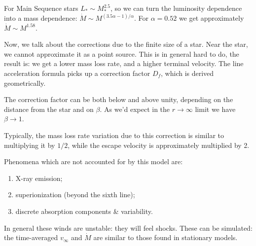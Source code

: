 \documentclass[main.tex]{subfiles}
\begin{document}
For Main Sequence stars \(L_{*} \sim M_{*}^{2.5}\), so we can turn the luminosity dependence into a mass dependence: \(\dot{M} \sim M^{(3.5 \alpha  - 1 ) / \alpha }\).
For \(\alpha = 0.52\) we get approximately \(\dot{M} \sim M^{1.58}\).

Now, we talk about the corrections due to the finite size of a star. Near the star, we cannot approximate it as a point source.
This is in general hard to do, the result is: we get a lower mass loss rate, and a higher terminal velocity. 
The line acceleration formula picks up a correction factor \(D_f\), which is derived geometrically. 


The correction factor can be both below and above unity, depending on the distance from the star and on \(\beta \). 
As we'd expect in the \(r \rightarrow \infty \) limit we have \(\beta \rightarrow 1\). 

Typically, the mass loss rate variation due to this correction is similar to multiplying it by \(1/2\), while the escape velocity is approximately multiplied by 2. 

Phenomena which are not accounted for by this model are: 
\begin{enumerate}
    \item X-ray emission;
    \item superionization (beyond the sixth line);
    \item discrete absorption components \& variability.
\end{enumerate}

In general these winds are unstable: they will feel shocks. 
These can be simulated: the time-averaged \(v_{ \infty }\) and \(\dot{M}\) are similar to those found in stationary models. 
\end{document}
